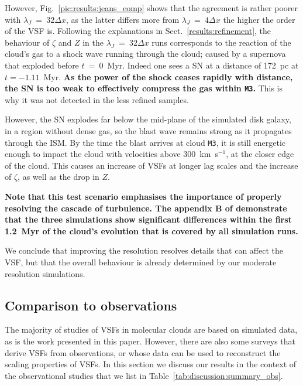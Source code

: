 However, Fig.~\ref{pic:results:jeans_comp} shows that the agreement is rather poorer with $\lambda_J$~=~$32\Delta{}x$, as the latter differs more from $\lambda_J$~=~$4\Delta{}x$ the higher the order of the VSF is.
Following the explanations in Sect.~\ref{results:refinement}, the behaviour of $\zeta$ and $Z$ in the $\lambda_J$~=~$32\Delta{}x$ runs corresponds to the reaction of the cloud's gas to a shock wave running through the cloud; caused by a supernova that exploded before $t$~=~0~Myr. 
Indeed one sees a SN at a distance of 172~pc at $t=-1.11$~Myr. 
\textbf{
As the power of the shock ceases rapidly with distance, the SN is too weak to effectively compress the gas within \texttt{M3}.
}
This is why it was not detected in the less refined samples.

However, the SN explodes far below the mid-plane of the simulated disk galaxy, in a region without dense gas, so the blast wave remains strong as it propagates through the ISM. 
By the time the blast arrives at cloud \texttt{M3}, it is still energetic enough to impact the cloud with velocities above 300~km~s$^{-1}$, at the closer edge of the cloud. 
This causes an increase of VSFs at longer lag scales and the increase of $\zeta$, as well as the drop in $Z$.

\textbf{
    Note that this test scenario emphasises the importance of properly resolving the cascade of turbulence. 
    The appendix B of  demonstrate that the three simulations show significant differences within the first 1.2~Myr of the cloud's evolution that is covered by all simulation runs. 
}

We conclude that improving the resolution resolves details that can affect the VSF, but that the overall behaviour is already determined by our moderate resolution simulations.

\subsection{Comparison to observations}\label{discussion:observation}

The majority of studies of VSFs in molecular clouds are based on simulated data, as is the work presented in this paper.
However, there are also some surveys that derive VSFs from observations, or whose data can be used to reconstruct the scaling properties of VSFs. 
In this section we discuss our results in the context of the observational studies that we list in Table~\ref{tab:discussion:summary_obs}.

